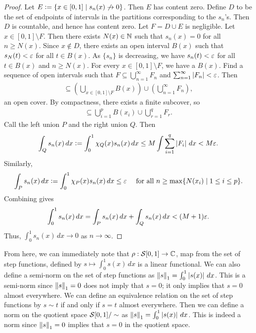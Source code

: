 \begin{proof}
    Let $E \vcentcolon= \{x \in [0,1] \mid s_{n}(x) \not\to 0\}$. Then $E$ has content zero. Define $D$ to be the set of endpoints of intervals in the partitions corresponding to the $s_{n}$'s. Then $D$ is countable, and hence has content zero. Let $F = D \cup E$ is negligible. Let $x \in [0,1]\setminus F$. Then there exists $N(x) \in \mathbb{N}$ such that $s_{n}(x) = 0$ for all $n \geq N(x)$. Since $x \notin D$, there exists an open interval $B(x)$ such that $s_{N}(t) < \varepsilon$ for all $t \in B(x)$. As $\{s_{n}\}$ is decreasing, we have $s_{n}(t) < \varepsilon$ for all $t \in B(x)$ and $n \geq N(x)$. For every $x \in [0,1]\setminus F$, we have a $B(x)$. Find a sequence of open intervals such that $F \subseteq \bigcup_{n=1}^{\infty} F_{n}$ and $\sum_{n=1}^{\infty} \left| F_{n} \right| < \varepsilon$. Then
    \begin{align}
        [0,1] \subseteq \left( \bigcup_{x \in [0,1]\setminus F} B(x) \right) \cup \left( \bigcup_{n=1}^{\infty} F_{n} \right),
    \end{align}
    an open cover. By compactness, there exists a finite subcover, so
    \begin{align}
        [0,1] \subseteq \bigcup_{i=1}^{p} B(x_{i}) \cup \bigcup_{r=1}^{q} F_{r}.
    \end{align}
    Call the left union $P$ and the right union $Q$. Then
    \begin{align}
        \int_{Q} s_{n}(x) \, dx \vcentcolon= \int_{0}^{1} \chi_{Q}(x) s_{n}(x) \, dx \leq M \int \sum_{i=1}^{q} \left| F_{i} \right| \, dx < M \varepsilon.
    \end{align}
    Similarly,
    \begin{align}
        \int_{P} s_{n}(x) \, dx \vcentcolon= \int_{0}^{1} \chi_{P}(x) s_{n}(x) \, dx \leq \varepsilon \quad \text{ for all } n \geq \max\{N(x_{i}) \mid 1 \leq i \leq p\}.
    \end{align}
    Combining gives
    \begin{align}
        \int_{0}^{1} s_{n}(x) \, dx = \int_{P} s_{n}(x) \, dx + \int_{Q} s_{n}(x) \, dx < (M+1)\varepsilon.
    \end{align}
    Thus, $\int_{0}^{1} s_{n}(x) \, dx \to 0$ as $n \to \infty$.
\end{proof}

From here, we can immediately note that $\rho:\mathcal{S}[0,1] \to \mathbb{C}$, map from the set of step functions, defined by $s \mapsto \int_{0}^{1} s(x) \, dx$ is a linear functional. We can also define a semi-norm on the set of step functions as $\left\lVert s\right\rVert_{1} = \int_{0}^{1} \left| s(x) \right| \, dx$. This is a semi-norm since $\left\lVert s\right\rVert_{1} = 0$ does not imply that $s = 0$; it only implies that $s = 0$ almost everywhere. We can define an equivalence relation on the set of step functions by $s \sim t$ if and only if $s = t$ almost everywhere. Then we can define a norm on the quotient space $\mathcal{S}[0,1]/\sim$ as $\left\lVert s\right\rVert_{1} = \int_{0}^{1} \left| s(x) \right| \, dx$. This is indeed a norm since $\left\lVert s\right\rVert_{1} = 0$ implies that $s = 0$ in the quotient space.


